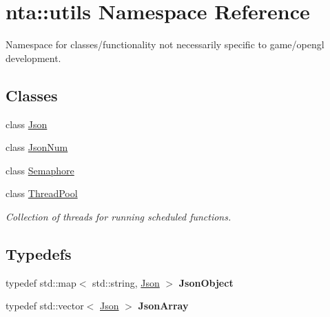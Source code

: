 \hypertarget{namespacenta_1_1utils}{}\section{nta\+:\+:utils Namespace Reference}
\label{namespacenta_1_1utils}


Namespace for classes/functionality not necessarily specific to game/opengl development.  


\subsection*{Classes}
\begin{DoxyCompactItemize}
\item 
class \hyperlink{classnta_1_1utils_1_1Json}{Json}
\item 
class \hyperlink{classnta_1_1utils_1_1JsonNum}{Json\+Num}
\item 
class \hyperlink{classnta_1_1utils_1_1Semaphore}{Semaphore}
\item 
class \hyperlink{classnta_1_1utils_1_1ThreadPool}{Thread\+Pool}
\begin{DoxyCompactList}\small\item\em Collection of threads for running scheduled functions. \end{DoxyCompactList}\end{DoxyCompactItemize}
\subsection*{Typedefs}
\begin{DoxyCompactItemize}
\item 
\mbox{\label{namespacenta_1_1utils_aacec41f909698427351bd2d4e6bfb0ff}} 
typedef std\+::map$<$ std\+::string, \hyperlink{classnta_1_1utils_1_1Json}{Json} $>$ {\bfseries Json\+Object}
\item 
\mbox{\label{namespacenta_1_1utils_a016ff68f749b52514dae354976f110ea}} 
typedef std\+::vector$<$ \hyperlink{classnta_1_1utils_1_1Json}{Json} $>$ {\bfseries Json\+Array}
\end{DoxyCompactItemize}
